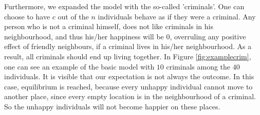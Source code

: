 Furthermore, we expanded the model with the so-called 'criminals'.
One can choose to have $c$ out of the $n$ individuals behave as if they were a criminal.
Any person who is not a criminal himself, does not like criminals in his neighbourhood, and thus his/her happiness will be $0$, overruling any positive effect of friendly neighbours, if a criminal lives in his/her neighbourhood.
As a result, all criminals should end up living together.
In Figure \ref{fig:examplecrim}, one can see an example of the basic model with $10$ criminals among the $40$ individuals.
It is visible that our expectation is not always the outcome.
In this case, equilibrium is reached, because every unhappy individual cannot move to another place, since every empty location is in the neighbourhood of a criminal.
So the unhappy individuals will not become happier on these places.

